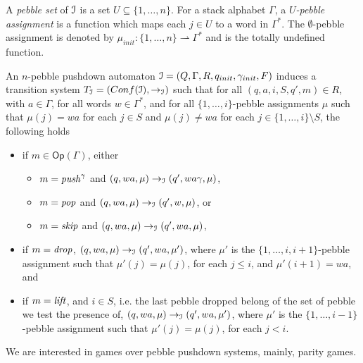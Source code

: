 \documentclass[a4paper,UKenglish,cleveref, autoref, thm-restate]{lipics-v2021}
\newcommand{\Conf}{\mathsf{Conf}}
\newcommand{\Op}{\mathsf{Op}}
\begin{document}
A {\em pebble set} of $\mathcal{I}$ is a set $U \subseteq \{ 1, \ldots, n\}$. For a stack alphabet $\Gamma$, a 
{\em $U \!$-pebble assignment} is a function which maps each $j \in U$ to a word in $ \Gamma^*$.
The $\emptyset$-pebble assignment is denoted by $\mu_{init} :  \{ 1, \ldots, n\} \rightharpoonup  \Gamma^* $ and is the 
totally undefined function.




\begin{samepage}
An $n$-pebble pushdown automaton $\mathcal{I} =  (Q, \Gamma,  R, q_{init}, {\gamma_{init}} , F)$ induces 
a transition system  $T_{\ppda} = (\Conf(\ppda), \rightarrow_{\ppda})$ 
 such that
for all $(q, a, i, S, q', m) \in R$, with $a \in \Gamma$,
 for all words $w \in  \Gamma^*$, and for all $\{ 1, \ldots , i \}$-pebble assignments $\mu$ such that $\mu(j) = wa$ 
 for each
$j \in S$ 	and
 $\mu(j) \neq wa$ 
 for each $j \in \{ 1, \ldots , i \} \setminus S$,
the following holds
\begin{itemize}
\item if $m \in \Op(\Gamma)$, 
either
\begin{itemize}
\item $ m = \text{\textit{push}}^\gamma$ and $(q,wa,\mu) \rightarrow_{\mathcal{I}} (q',wa\gamma, \mu)$,

\item $ m = \text{\textit{pop}}$ and $(q,wa,\mu) \rightarrow_{\mathcal{I}} (q',w, \mu)$, or

\item $ m = \text{\textit{skip}}$ and $(q,wa,\mu) \rightarrow_{\mathcal{I}} (q',wa, \mu)$,
\end{itemize}
\item if $ m = \text{\textit{drop}}$, 
$(q,wa,\mu) \rightarrow_{\mathcal{I}} (q',wa, \mu')$,  
where $\mu'$ is the $\{ 1, \ldots , i, i+1 \}$-pebble assignment such that
$\mu'(j) = \mu(j)$, for each
$j \leq i$, and $\mu'(i+1) = wa$, and
\item if $m = \text{\textit{lift}}$, and $i \in S$, i.e. the last pebble dropped belong of the set of pebble we test the presence of,
$(q,wa,\mu) \rightarrow_{\mathcal{I}} (q',wa, \mu')$, 
where $\mu'$ is the $\{ 1, \ldots , i - 1 \}$-pebble assignment such that
$\mu'(j) = \mu(j)$, for each
$j < i$.
\end{itemize}
\end{samepage}


\par\noindent\ignorespacesafterend
We are interested in games over pebble pushdown systems, 
mainly, parity games.
\end{document}
